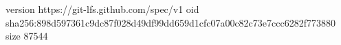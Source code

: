 version https://git-lfs.github.com/spec/v1
oid sha256:898d597361c9dc87f028d49df99dd659d1cfc07a00c82c73e7ccc6282f773880
size 87544

